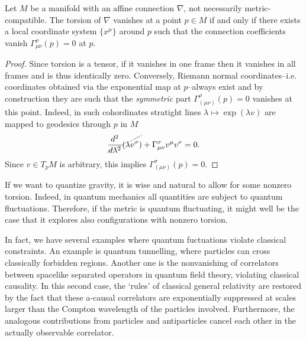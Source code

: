\documentclass[../geometry_main.tex]{subfiles}
\begin{document}
\begin{theorem}
Let \(M\) be a manifold with an affine connection \(\nabla\), not necessarily metric-compatible.
The torsion of \(\nabla\) vanishes at a point \(p \in M\) if and only if there exists a local coordinate system \(\{x^{\mu}\}\) around \(p\) such that the connection coefficients vanish \(\Gamma^{\rho}_{\mu \nu} (p) = 0\) at $p$.
\end{theorem}
\begin{proof}
Since torsion is a tensor, if it vanishes in one frame then it vanishes in all frames and is thus identically zero.
Conversely, Riemann normal coordinates--i.e. coordinates obtained via the exponential map at \(p\)--always exist and by construction they are such that the \emph{symmetric} part $\Gamma^{\rho}_{(\mu \nu)}(p)=0$ vanishes at this point.
Indeed, in such cohordinates stratight lines $\lambda\mapsto \exp(\lambda v)$ are mapped to geodesics through $p$ in $M$ 
\begin{equation}
    \graycancel{\frac{d^2}{d \lambda^2} (\lambda v^\sigma)}+ \Gamma^{\sigma}_{\mu \nu} v^\mu v^\nu = 0.
\end{equation}
Since $v\in T_pM$ is arbitrary, this implies $\Gamma^{\sigma}_{(\mu \nu)}(p)=0$.
\end{proof}


\begin{mytheorem}
If we want to quantize gravity, it is wise and natural to allow for some nonzero torsion.
Indeed, in quantum mechanics all quantities are subject to quantum fluctuations.
Therefore, if the metric is quantum fluctuating, it might well be the case that it explores also configurations with nonzero torsion.

In fact, we have several examples where quantum fuctuations violate classical constraints.
An example is quantum tunnelling, where  particles can cross classically forbidden regions.
Another one is the nonvanishing of correlators between spacelike separated operators in quantum field theory, violating classical causality.
In this second case, the `rules' of classical general relativity are restored by the fact that these a-causal correlators are exponentially suppressed at scales larger than the Compton wavelength of the particles involved.
Furthermore, the analogous contributions from particles and antiparticles cancel each other in the actually observable correlator.
\end{mytheorem}
\end{document}
